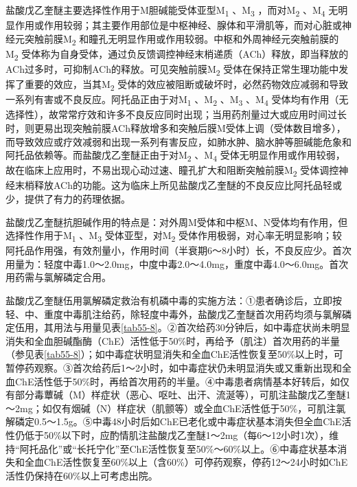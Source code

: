 盐酸戊乙奎醚主要选择性作用于M胆碱能受体亚型M\textsubscript{1}
、M\textsubscript{3} ，而对M\textsubscript{2} 、M\textsubscript{4}
无明显作用或作用较弱；其主要作用部位是中枢神经、腺体和平滑肌等，而对心脏或神经元突触前膜M\textsubscript{2}
和瞳孔无明显作用或作用较弱。中枢和外周神经元突触前膜的M\textsubscript{2}
受体称为自身受体，通过负反馈调控神经末梢递质（ACh）释放，即当释放的ACh过多时，可抑制ACh的释放。可见突触前膜M\textsubscript{2}
受体在保持正常生理功能中发挥了重要的效应，当其M\textsubscript{2}
受体的效应被阻断或破坏时，必然药物效应减弱和导致一系列有害或不良反应。阿托品正由于对M\textsubscript{1}
、M\textsubscript{2} 、M\textsubscript{3} 、M\textsubscript{4}
受体均有作用（无选择性），故常常疗效和许多不良反应同时出现；当用药剂量过大或应用时间过长时，则更易出现突触前膜ACh释放增多和突触后膜M受体上调（受体数目增多），而导致效应或疗效减弱和出现一系列有害反应，如肺水肿、脑水肿等胆碱能危象和阿托品依赖等。而盐酸戊乙奎醚正由于对M\textsubscript{2}
、M\textsubscript{4}
受体无明显作用或作用较弱，故在临床上应用时，不易出现心动过速、瞳孔扩大和阻断突触前膜M\textsubscript{2}
受体调控神经末梢释放ACh的功能。这为临床上所见盐酸戊乙奎醚的不良反应比阿托品轻或少，提供了有力的药理依据。

盐酸戊乙奎醚抗胆碱作用的特点是：对外周M受体和中枢M、N受体均有作用，但选择性作用于M\textsubscript{1}
、M\textsubscript{3} 受体亚型，对M\textsubscript{2}
受体作用极弱，对心率无明显影响；较阿托品作用强，有效剂量小，作用时间（半衰期6～8小时）长，不良反应少。首次用量为：轻度中毒1.0～2.0mg，中度中毒2.0～4.0mg，重度中毒4.0～6.0mg。首次用药需与氯解磷定合用。

盐酸戊乙奎醚伍用氯解磷定救治有机磷中毒的实施方法：①患者确诊后，立即按轻、中、重度中毒肌注给药，除轻度中毒外，盐酸戊乙奎醚首次用药均须与氯解磷定伍用，其用法与用量见表\ref{tab55-8}。②首次给药30分钟后，如中毒症状尚未明显消失和全血胆碱酯酶（ChE）活性低于50\%时，再给予（肌注）首次用药的半量（参见表\ref{tab55-8}）；如中毒症状明显消失和全血ChE活性恢复至50\%以上时，可暂停药观察。③首次给药后1～2小时，如中毒症状仍未明显消失或又重新出现和全血ChE活性低于50\%时，再给首次用药的半量。④中毒患者病情基本好转后，如仅有部分毒蕈碱（M）样症状（恶心、呕吐、出汗、流涎等），可肌注盐酸戊乙奎醚1～2mg；如仅有烟碱（N）样症状（肌颤等）或全血ChE活性低于50\%，可肌注氯解磷定0.5～1.5g。⑤中毒48小时后如ChE已老化或中毒症状基本消失但全血ChE活性仍低于50\%以下时，应酌情肌注盐酸戊乙奎醚1～2mg（每6～12小时1次），维持“阿托品化”或“长托宁化”至ChE活性恢复至50\%～60\%以上。⑥中毒症状基本消失和全血ChE活性恢复至60\%以上（含60\%）可停药观察，停药12～24小时如ChE活性仍保持在60\%以上可考虑出院。


